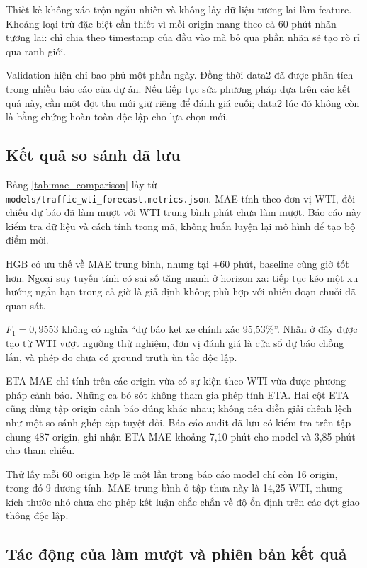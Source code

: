     Thiết kế không xáo trộn ngẫu nhiên và không lấy dữ liệu tương lai làm feature. Khoảng loại trừ đặc biệt cần thiết vì mỗi origin mang theo cả 60 phút nhãn tương lai: chỉ chia theo timestamp của đầu vào mà bỏ qua phần nhãn sẽ tạo rò rỉ qua ranh giới.

    Validation hiện chỉ bao phủ một phần ngày. Đồng thời data2 đã được phân tích trong nhiều báo cáo của dự án. Nếu tiếp tục sửa phương pháp dựa trên các kết quả này, cần một đợt thu mới giữ riêng để đánh giá cuối; data2 lúc đó không còn là bằng chứng hoàn toàn độc lập cho lựa chọn mới.

    \subsection{Kết quả so sánh đã lưu}
    Bảng \ref{tab:mae_comparison} lấy từ \texttt{models/traffic\_wti\_forecast.metrics.json}. MAE tính theo đơn vị WTI, đối chiếu dự báo đã làm mượt với WTI trung bình phút chưa làm mượt. Báo cáo này kiểm tra dữ liệu và cách tính trong mã, không huấn luyện lại mô hình để tạo bộ điểm mới.

    

    HGB có ưu thế về MAE trung bình, nhưng tại +60 phút, baseline cùng giờ tốt hơn. Ngoại suy tuyến tính có sai số tăng mạnh ở horizon xa: tiếp tục kéo một xu hướng ngắn hạn trong cả giờ là giả định không phù hợp với nhiều đoạn chuỗi đã quan sát.

    

    $F_1 = 0,9553$ không có nghĩa ``dự báo kẹt xe chính xác 95,53\%''. Nhãn ở đây được tạo từ WTI vượt ngưỡng thử nghiệm, đơn vị đánh giá là cửa sổ dự báo chồng lấn, và phép đo chưa có ground truth ùn tắc độc lập.

    ETA MAE chỉ tính trên các origin vừa có sự kiện theo WTI vừa được phương pháp cảnh báo. Những ca bỏ sót không tham gia phép tính ETA. Hai cột ETA cũng dùng tập origin cảnh báo đúng khác nhau; không nên diễn giải chênh lệch như một so sánh ghép cặp tuyệt đối. Báo cáo audit đã lưu có kiểm tra trên tập chung 487 origin, ghi nhận ETA MAE khoảng 7,10 phút cho model và 3,85 phút cho tham chiếu.

    Thử lấy mỗi 60 origin hợp lệ một lần trong báo cáo model chỉ còn 16 origin, trong đó 9 dương tính. MAE trung bình ở tập thưa này là 14,25 WTI, nhưng kích thước nhỏ chưa cho phép kết luận chắc chắn về độ ổn định trên các đợt giao thông độc lập.

    \subsection{Tác động của làm mượt và phiên bản kết quả}

